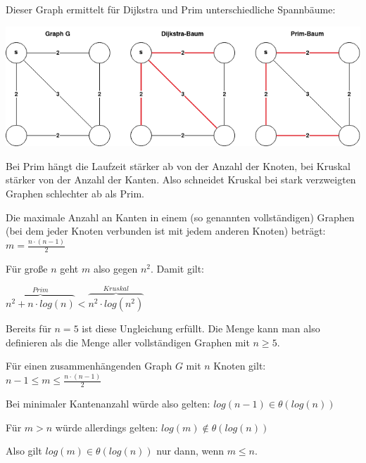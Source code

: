 \newpage
\begin{aufgabe}
\begin{teile}
	\item
	Dieser Graph  ermittelt für Dijkstra und Prim unterschiedliche Spannbäume:
	
	\includegraphics[scale=0.6]{Dijkstra_a} \\

	\item
	Bei Prim hängt die Laufzeit stärker ab von der Anzahl der Knoten, bei Kruskal stärker von der Anzahl der Kanten. Also schneidet Kruskal bei stark verzweigten Graphen schlechter ab als Prim. 
	
	Die maximale Anzahl an Kanten in einem (so genannten \glqq vollständigen\grqq) Graphen (bei dem jeder Knoten verbunden ist mit jedem anderen Knoten) beträgt: $m = \frac{n \cdot (n - 1)}{2}$
	
	Für große $n$ geht $m$ also gegen $n^2$. Damit gilt:
	
	$\overbrace{n^2 + n \cdot log(n)}^{Prim} < 
	\overbrace{n^2 \cdot log (n^2)}^{Kruskal}$ 
	
	Bereits für $n = 5$ ist diese Ungleichung erfüllt. Die Menge kann man also definieren als die Menge aller vollständigen Graphen mit $n \geq 5$.\\
	
	\item
	Für einen zusammenhängenden Graph $G$ mit $n$ Knoten gilt: $n - 1 \leq m \leq \frac{n \cdot (n - 1)}{2}$
	 
	Bei minimaler Kantenanzahl würde also gelten: $log (n-1) \in \theta(log(n))$
	
	Für $m > n$ würde allerdings gelten: $log(m) \notin \theta(log(n))$
	
	Also gilt $log (m) \in \theta(log(n))$ nur dann, wenn $m \leq n$.
	 
	
	
\end{teile}
\end{aufgabe}

